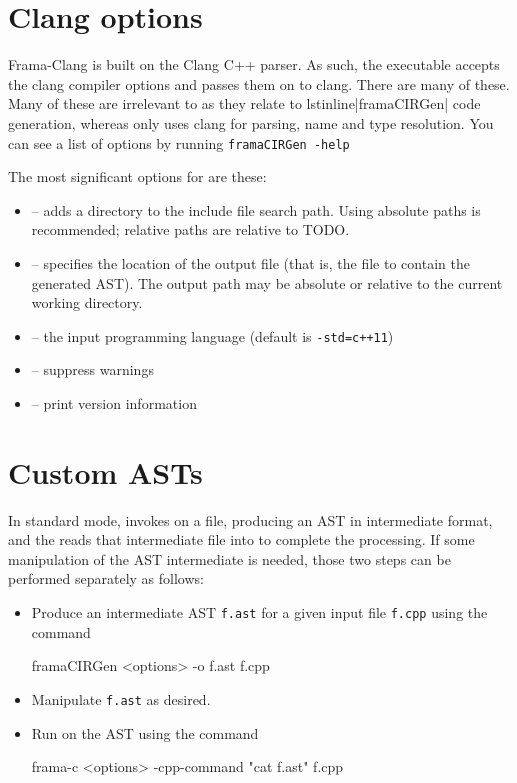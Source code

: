 \section{Clang options}

Frama-Clang is built on the Clang C++ parser. 
As such, the \irg executable accepts the clang
compiler options and passes them on to clang. There are many of these.
Many of these are irrelevant to \fcl as they relate to lstinline|framaCIRGen|
code generation, whereas \fcl only uses clang for parsing, name
and type resolution.
You can see a list of options by running 
\lstinline|framaCIRGen -help|

The most significant options for  \irg are these:
\begin{itemize}
	\item {} -- adds a directory to the include file search path. Using absolute paths is recommended; relative paths are relative to TODO.
	\item {} -- specifies the location of the output file (that is, the file to contain the generated AST). The output path may be absolute or relative to the current working directory.
	\item {} -- the input programming language (default is \lstinline|-std=c++11|)
	\item {} -- suppress warnings
	\item {} -- print version information
\end{itemize}

\section{Custom ASTs}

In standard mode, \framac invokes \irg on a file, producing an AST in intermediate format, and the reads that intermediate file into \framac to complete the processing.
If some manipulation of the AST intermediate is needed, those two steps can be performed separately as follows:
\begin{itemize}
\item Produce an intermediate AST \lstinline|f.ast| for a given input file \lstinline|f.cpp| using the command \\
\centerline{\normalsize{framaCIRGen <options> -o f.ast f.cpp}}
\item Manipulate \lstinline|f.ast| as desired.
\item Run \framac on the AST using the command \\
\centerline{\normalsize{frama-c <options> -cpp-command "cat f.ast" f.cpp}}
\end{itemize}


